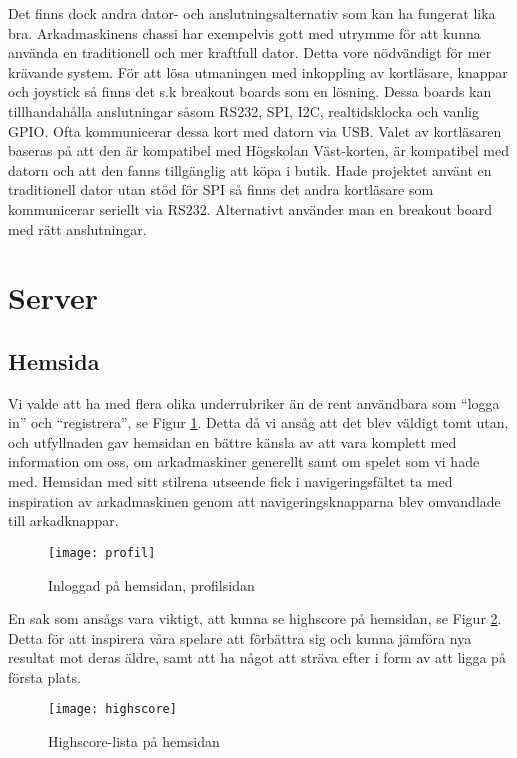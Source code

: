 \documentclass[12pt,fleqn,openany]{book} %
\begin{document}
Det finns dock andra dator- och anslutningsalternativ som kan ha fungerat lika bra. Arkadmaskinens chassi har exempelvis gott med utrymme 
för att kunna använda en traditionell och mer kraftfull dator. Detta vore nödvändigt för mer krävande system. För att lösa utmaningen med 
inkoppling av kortläsare, knappar och joystick så finns det s.k breakout boards som en lösning. Dessa boards kan tillhandahålla anslutningar 
såsom RS232, SPI, I2C, realtidsklocka och vanlig GPIO. Ofta kommunicerar dessa kort med datorn via USB. Valet av kortläsaren baseras på att 
den är kompatibel med Högskolan Väst-korten, är kompatibel med datorn och att den fanns tillgänglig att köpa i butik. Hade projektet använt 
en traditionell dator utan stöd för SPI så finns det andra kortläsare som kommunicerar seriellt via RS232. Alternativt använder man en 
breakout board med rätt anslutningar.

\section{Server}

\subsection{Hemsida}

Vi valde att ha med flera olika underrubriker än de rent användbara som “logga in” och “registrera”, se Figur \ref{fig_profilsida}.
Detta då vi ansåg att det blev väldigt tomt utan, och utfyllnaden gav hemsidan en bättre känsla av att vara komplett med information om 
oss, om arkadmaskiner generellt samt om spelet som vi hade med. Hemsidan med sitt stilrena utseende fick i navigeringsfältet ta med inspiration av arkadmaskinen genom att navigeringsknapparna blev 
omvandlade till arkadknappar. 

\begin{figure}[h]
\centering\texttt{[image: profil]}
\caption{Inloggad på hemsidan, profilsidan}
\label{fig_profilsida}
\end{figure}

En sak som ansågs vara viktigt, att kunna se highscore på hemsidan, se Figur \ref{fig_highscore}. Detta för att inspirera våra spelare att förbättra sig och kunna
jämföra nya resultat mot deras äldre, samt att ha något att sträva efter i form av att ligga på första plats.

\begin{figure}[!h]
\centering\texttt{[image: highscore]}
\caption{Highscore-lista på hemsidan}
\label{fig_highscore}
\end{figure}
\end{document}
